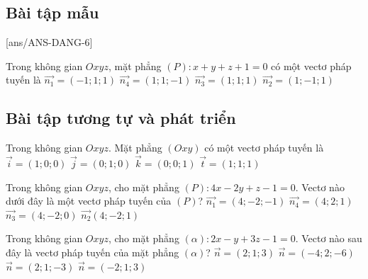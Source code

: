 \subsection{Bài tập mẫu}
[ans/ANS-DANG-6]
\begin{khung}
\begin{vd}%
	Trong không gian $Oxyz$, mặt phẳng $(P)\colon x+y+z+1=0$ có một vectơ pháp tuyến là
	\choice
	{$\overrightarrow{n_1}=(-1;1;1)$}
	{$\overrightarrow{n_4}=(1;1;-1)$}
	{\True $\overrightarrow{n_3}=(1;1;1)$}
	{$\overrightarrow{n_2}=(1;-1;1)$}
\end{vd}
\end{khung}

\subsection{Bài tập tương tự và phát triển}
\begin{ex}%
	Trong không gian $Oxyz$. Mặt phẳng $(Oxy)$ có một vectơ pháp tuyến là
	\choice
	{$\overrightarrow{i}=(1;0;0)$}
	{$\overrightarrow{j}=(0;1;0)$}
	{\True $\overrightarrow{k}=(0;0;1)$}
	{$\overrightarrow{t}=(1;1;1)$}
\end{ex}
\begin{ex}%
	Trong không gian $Oxyz$, cho mặt phẳng $(P) \colon 4x-2y+z-1=0$. Vectơ nào dưới đây là một vectơ pháp tuyến của $(P)$?
	\choice
	{$\overrightarrow{n_1}=(4;-2;-1)$}
	{$\overrightarrow{n_4}=(4;2;1)$}
	{$\overrightarrow{n_3}=(4;-2;0)$}
	{\True $\overrightarrow{n_2}(4;-2;1)$}
\end{ex}

\begin{ex}%
	Trong không gian $Oxyz$, cho mặt phẳng $(\alpha) \colon 2x-y+3z-1=0$. Vectơ nào sau đây là vectơ pháp tuyến của mặt phẳng $(\alpha)$?
	\choice
	{$\overrightarrow{n}=(2;1;3)$}
	{\True $\overrightarrow{n}=(-4;2;-6)$}
	{$\overrightarrow{n}=(2;1;-3)$}
	{$\overrightarrow{n}=(-2;1;3)$}
\end{ex}

